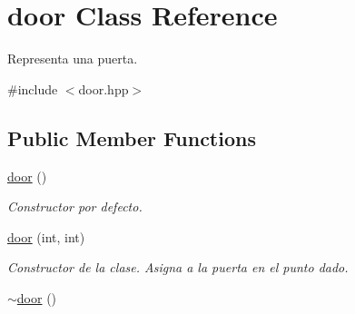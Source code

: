 \hypertarget{classdoor}{\section{door Class Reference}
\label{classdoor}
}


Representa una puerta.  




{\ttfamily \#include $<$door.\-hpp$>$}

\subsection*{Public Member Functions}
\begin{DoxyCompactItemize}
\item 
\hypertarget{classdoor_a89b2c766687197cc118314045231cbc7}{\hyperlink{classdoor_a89b2c766687197cc118314045231cbc7}{door} ()}\label{classdoor_a89b2c766687197cc118314045231cbc7}

\begin{DoxyCompactList}\small\item\em Constructor por defecto. \end{DoxyCompactList}\item 
\hypertarget{classdoor_a9199447935d5af5c053e2143ee6382c7}{\hyperlink{classdoor_a9199447935d5af5c053e2143ee6382c7}{door} (int, int)}\label{classdoor_a9199447935d5af5c053e2143ee6382c7}

\begin{DoxyCompactList}\small\item\em Constructor de la clase. Asigna a la puerta en el punto dado. \end{DoxyCompactList}\item 
\hypertarget{classdoor_a228479b26ce28e11f251962f5231a1e8}{\hyperlink{classdoor_a228479b26ce28e11f251962f5231a1e8}{$\sim$door} ()}\label{classdoor_a228479b26ce28e11f251962f5231a1e8}


\end{DoxyCompactItemize}
